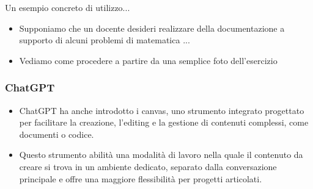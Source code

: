 \documentclass[aspectratio=169]{beamer}
\begin{document}
%
%
\begin{frame}{Un esempio concreto di utilizzo...}
  \begin{itemize}
    \item Supponiamo che un docente desideri realizzare della documentazione a supporto di alcuni problemi di matematica ...
    \item Vediamo come procedere a partire da una semplice foto dell'esercizio 
  \end{itemize}
\end{frame}
%
%
\begin{frame}
\frametitle{ChatGPT}
\begin{itemize}
    \item ChatGPT ha anche introdotto i canvas, uno strumento integrato progettato per facilitare la creazione, l’editing e la gestione di contenuti complessi, come documenti o codice.
    \item Questo strumento abilità una modalità di lavoro nella quale il contenuto da creare si trova in un ambiente dedicato, separato dalla conversazione principale e offre una maggiore flessibilità per progetti articolati.
\end{itemize}
\end{frame}
%
\end{document}
